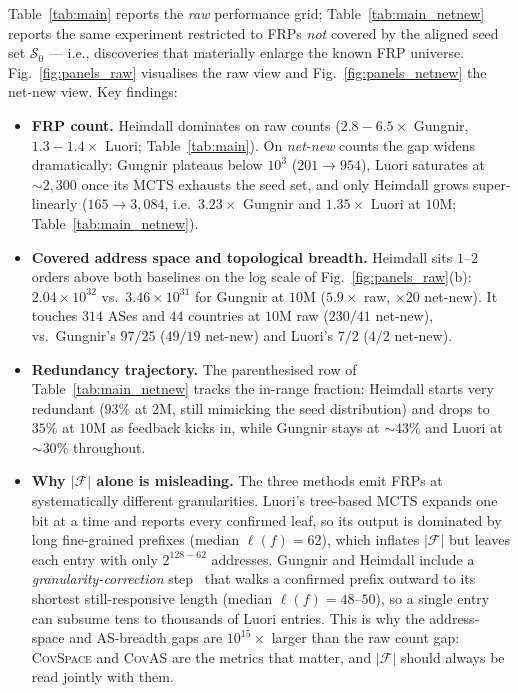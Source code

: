 \documentclass[conference]{IEEEtran}
\begin{document}
Table~\ref{tab:main} reports the \emph{raw} performance grid;
Table~\ref{tab:main_netnew} reports the same experiment
restricted to FRPs \emph{not} covered by the aligned
seed set $\mathcal{S}_{0}$ --- i.e., discoveries that materially
enlarge the known FRP universe.  Fig.~\ref{fig:panels_raw}
visualises the raw view and Fig.~\ref{fig:panels_netnew} the
net-new view.  Key findings:
\begin{itemize}
   \item \textbf{FRP count.}  Heimdall dominates on raw counts
   ($2.8\!-\!6.5\times$ Gungnir, $1.3\!-\!1.4\times$ Luori;
   Table~\ref{tab:main}).  On \emph{net-new} counts the gap
   widens dramatically: Gungnir plateaus below $10^{3}$
   ($201\!\to\!954$), Luori saturates at $\sim\!2{,}300$ once
   its MCTS exhausts the seed set, and only Heimdall grows
   super-linearly ($165\!\to\!3{,}084$, i.e.\ $3.23\times$
   Gungnir and $1.35\times$ Luori at $10$M;
   Table~\ref{tab:main_netnew}).
   \item \textbf{Covered address space and topological breadth.}
   Heimdall sits $1$--$2$ orders above both baselines on the
   log scale of Fig.~\ref{fig:panels_raw}(b): $2.04{\times}10^{32}$
   vs.\ $3.46{\times}10^{31}$ for Gungnir at $10$M ($5.9\times$
   raw, $\times 20$ net-new).  It touches $314$ ASes and $44$
   countries at $10$M raw ($230/41$ net-new), vs.\ Gungnir's
   $97/25$ ($49/19$ net-new) and Luori's $7/2$ ($4/2$ net-new).
   \item \textbf{Redundancy trajectory.}  The parenthesised row
   of Table~\ref{tab:main_netnew} tracks the in-range fraction:
   Heimdall starts very redundant ($93\%$ at $2$M, still mimicking
   the seed distribution) and drops to $35\%$ at $10$M as
   feedback kicks in, while Gungnir stays at $\sim\!43\%$ and
   Luori at $\sim\!30\%$ throughout.
   \item \textbf{Why $|\mathcal{F}|$ alone is misleading.}
   The three methods emit FRPs at systematically different
   granularities.  Luori's tree-based MCTS expands one bit at a
   time and reports every confirmed leaf, so its output is
   dominated by long fine-grained prefixes (median
   $\ell(f){=}62$), which inflates $|\mathcal{F}|$ but leaves
   each entry with only $2^{128-62}$ addresses.  Gungnir and
   Heimdall include a \emph{granularity-correction}
   step~\cite{wei2025gungnir} that walks a confirmed prefix
   outward to its shortest still-responsive length (median
   $\ell(f){=}48$--$50$), so a single entry can subsume tens to
   thousands of Luori entries.  This is why the address-space
   and AS-breadth gaps are $10^{15}\times$ larger than the raw
   count gap: \textsc{CovSpace} and \textsc{CovAS} are the
   metrics that matter, and $|\mathcal{F}|$ should always be
   read jointly with them.
\end{itemize}
\end{document}
